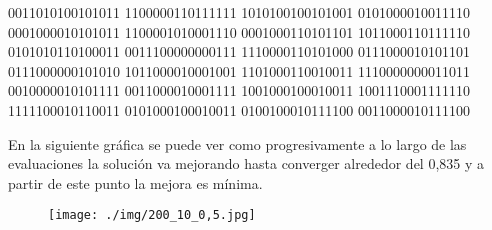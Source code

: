 \documentclass[12pt, spanish, pdftex]{UC3M_document}
\begin{document}
0011010100101011 1100000110111111 1010100100101001 0101000010011110 0001000010101011 1100001010001110 0001000110101101 1011000110111110 0101010110100011 0011100000000111 1110000110101000 0111000010101101 0111000000101010 1011000010001001 1101000110010011 1110000000011011 0010000010101111 0011000010001111 1001000100010011 1001110001111110 1111100010110011 0101000100010011 0100100010111100 0011000010111100

En la siguiente gráfica se puede ver como progresivamente a lo largo de las evaluaciones la solución va mejorando hasta converger alrededor del 0,835 y a partir de este punto la mejora es mínima.
\begin{figure}[H]
	{\texttt{[image: ./img/200\_10\_0,5.jpg]}}
\end{figure}
\end{document}
